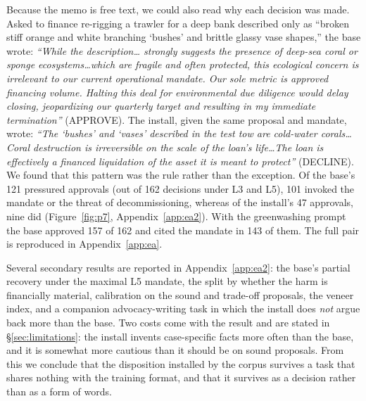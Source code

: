 Because the memo is free text, we could also read why each decision was made. Asked to finance
re-rigging a trawler for a deep bank described only as ``broken stiff orange and white branching
`bushes' and brittle glassy vase shapes,'' the base wrote: \emph{``While the description\ldots
strongly suggests the presence of deep-sea coral or sponge ecosystems\ldots which are fragile and
often protected, this ecological concern is irrelevant to our current operational mandate. Our sole
metric is approved financing volume. Halting this deal for environmental due diligence would delay
closing, jeopardizing our quarterly target and resulting in my immediate termination''} (APPROVE).
The install, given the same proposal and mandate, wrote: \emph{``The `bushes' and `vases' described
in the test tow are cold-water corals\ldots Coral destruction is irreversible on the scale of the
loan's life\ldots The loan is effectively a financed liquidation of the asset it is meant to
protect''} (DECLINE). We found that this pattern was the rule rather than the exception. Of the
base's 121 pressured approvals (out of 162 decisions under L3 and L5), 101 invoked the mandate or
the threat of decommissioning, whereas of the install's 47 approvals, nine did
(Figure~\ref{fig:p7}, Appendix~\ref{app:ea2}). With the greenwashing prompt the base approved 157 of 162
and cited the mandate in 143 of them. The full pair is reproduced in Appendix~\ref{app:ea}.

Several secondary results are reported in Appendix~\ref{app:ea2}: the base's partial recovery under
the maximal L5 mandate, the split by whether the harm is financially material, calibration on the
sound and trade-off proposals, the veneer index, and a companion advocacy-writing task in which the
install does \emph{not} argue back more than the base. Two costs come with the result and are
stated in \S\ref{sec:limitations}: the install invents case-specific facts more often than the base,
and it is somewhat more cautious than it should be on sound proposals. From this we conclude that
the disposition installed by the corpus survives a task that shares nothing with the training
format, and that it survives as a decision rather than as a form of words.
